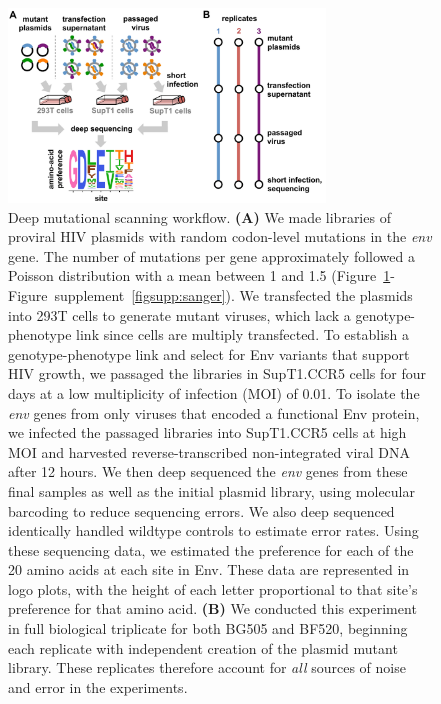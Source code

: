 \documentclass[9pt]{elife}
\begin{document}
\begin{figure}
\centerline{\includegraphics[width=0.75\textwidth]{figures/dms_schematic/dms_schematic.pdf}}
\caption{\label{fig:dms_schematic}
Deep mutational scanning workflow.
{\bf (A)} We made libraries of proviral HIV plasmids with random codon-level mutations in the \textit{env} gene.
The number of mutations per gene approximately followed a Poisson distribution with a mean between 1 and 1.5 (Figure~\ref{fig:dms_schematic}-Figure~supplement~\ref{figsupp:sanger}).
We transfected the plasmids into 293T cells to generate mutant viruses, which lack a genotype-phenotype link since cells are multiply transfected.
To establish a genotype-phenotype link and select for Env variants that support HIV growth, we passaged the libraries in SupT1.CCR5 cells for four days at a low multiplicity of infection (MOI) of 0.01.
To isolate the \textit{env} genes from only viruses that encoded a functional Env protein, we infected the passaged libraries into SupT1.CCR5 cells at high MOI and harvested reverse-transcribed non-integrated viral DNA after 12 hours.
We then deep sequenced the \textit{env} genes from these final samples as well as the initial plasmid library, using molecular barcoding to reduce sequencing errors.
We also deep sequenced identically handled wildtype controls to estimate error rates.
Using these sequencing data, we estimated the preference for each of the 20 amino acids at each site in Env.
These data are represented in logo plots, with the height of each letter proportional to that site's preference for that amino acid.
{\bf (B)} We conducted this experiment in full biological triplicate for both BG505 and BF520, beginning each replicate with independent creation of the plasmid mutant library.
These replicates therefore account for \emph{all} sources of noise and error in the experiments.
}
\end{figure}
\end{document}
